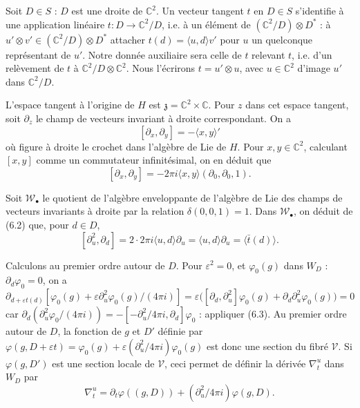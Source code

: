 \documentclass[12pt,a4paper]{article}
\theoremstyle{plain}
\theoremstyle{definition}
\theoremstyle{remark}
\begin{document}
Soit $D \in S$ : $D$ est une droite de $\mathbb{C}^2$. Un vecteur tangent $t$ en $D \in S$ s'identifie à une application linéaire $t \colon D \to \mathbb{C}^2/D$, i.e. à un élément de $(\mathbb{C}^2/D) \otimes D^*$ : à $u' \otimes v' \in (\mathbb{C}^2/D) \otimes D^*$ attacher $t(d) = \langle u, d \rangle v'$ pour $u$ un quelconque représentant de $u'$. Notre donnée auxiliaire sera celle de $t$ relevant $t$, i.e. d'un relèvement de $t$ à $\mathbb{C}^2/D \otimes \mathbb{C}^2$. Nous l'écrirons $t = u' \otimes u$, avec $u \in \mathbb{C}^2$ d'image $u'$ dans $\mathbb{C}^2/D$.

L'espace tangent à l'origine de $H$ est $\mathfrak{z} = \mathbb{C}^2 \times \mathbb{C}$. Pour $z$ dans cet espace tangent, soit $\partial_z$ le champ de vecteurs invariant à droite correspondant. On a
\[[\partial_x, \partial_y] = -\langle x, y \rangle'\]
où figure à droite le crochet dans l'algèbre de Lie de $H$. Pour $x, y \in \mathbb{C}^2$, calculant $[x, y]$ comme un commutateur infinitésimal, on en déduit que
\begin{equation}\label{eq:6.2}
[\partial_x, \partial_y] = -2\pi i\langle x, y \rangle(\partial_0, \partial_0, 1).\tag{6.2}
\end{equation}

Soit $\mathscr{W}_\bullet$ le quotient de l'algèbre enveloppante de l'algèbre de Lie des champs de vecteurs invariants à droite par la relation $\delta(0, 0, 1) = 1$. Dans $\mathscr{W}_\bullet$, on déduit de (6.2) que, pour $d \in D$,
\begin{equation}\label{eq:6.3}
[\partial_u^2, \partial_d] = 2 \cdot 2\pi i\langle u, d \rangle \partial_u = \langle u, d \rangle \partial_u = \langle \bar{t}(d) \rangle.\tag{6.3}
\end{equation}

Calculons au premier ordre autour de $D$. Pour $\varepsilon^2 = 0$, et $\varphi_0(g)$ dans $W_D$ : $\partial_d\varphi_0 = 0$, on a
\[\partial_{d + \varepsilon t(d)}[\varphi_0(g) + \varepsilon\partial_u^2\varphi_0(g)/(4\pi i)] = \varepsilon\bigl([\partial_d, \partial_u^2]\varphi_0(g) + \partial_d\partial_u^2\varphi_0(g)\bigr) = 0\]
car $\partial_d(\partial_u^2\varphi_0/(4\pi i)) = -[-\partial_u^2/4\pi i, \partial_d]\varphi_0$ : appliquer (6.3). Au premier ordre autour de $D$, la fonction de $g$ et $D'$ définie par $\varphi(g, D + \varepsilon t) = \varphi_0(g) + \varepsilon(\partial_u^2/4\pi i)\varphi_0(g)$ est donc une section du fibré $\mathscr{V}$. Si $\varphi(g, D')$ est une section locale de $\mathscr{V}$, ceci permet de définir la dérivée $\nabla_t^u$ dans $W_D$ par
\begin{equation}\label{eq:6.5}
\nabla_t^u = \partial_t\varphi((g, D)) + (\partial_u^2/4\pi i)\varphi(g, D).\tag{6.5}
\end{equation}
\end{document}
